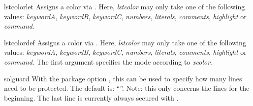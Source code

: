 \documentclass{sopra-base}
\begin{document}
\begin{command}{lstcolorlet}{}
    Assigns a color via . Here, \emph{lstcolor} may only take one of the following values: \emph{keywordA}, \emph{keywordB}, \emph{keywordC}, \emph{numbers}, \emph{literals}, \emph{comments}, \emph{highlight} or \emph{command}.
\end{command}

\begin{command}{lstcolordef}{}
    Assigns a color via . Here, \emph{lstcolor} may only take one of the following values: \emph{keywordA}, \emph{keywordB}, \emph{keywordC}, \emph{numbers}, \emph{literals}, \emph{comments}, \emph{highlight} or \emph{command}. The first argument specifies the mode according to \emph{xcolor}.
\end{command}

\begin{command}{solguard}{}
    With the package option , this can be used to specify how many lines need to be protected.
    The default is: ``{\makeatletter\@sol@guard@default}''. Note: this only concerns the lines for the beginning. The last line is currently always secured with .
\end{command}
\end{document}
